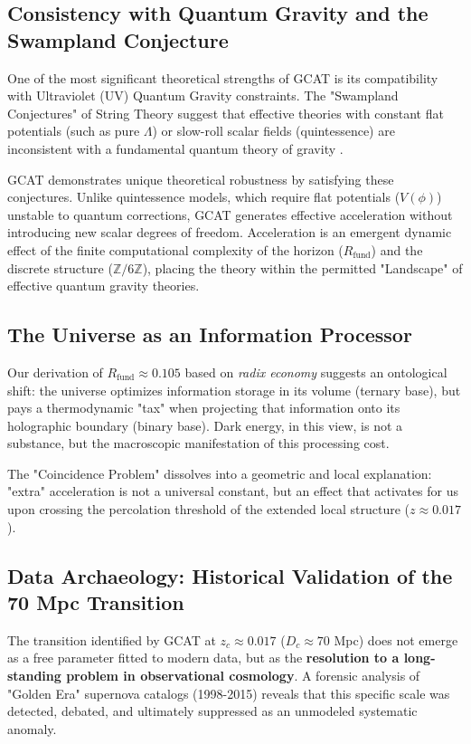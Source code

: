 \documentclass[12pt, a4paper]{article}
\theoremstyle{plain}
\theoremstyle{definition}
\begin{document}
\subsection{Consistency with Quantum Gravity and the Swampland Conjecture}

One of the most significant theoretical strengths of GCAT is its compatibility with Ultraviolet (UV) Quantum Gravity constraints. The "Swampland Conjectures" of String Theory suggest that effective theories with constant flat potentials (such as pure $\Lambda$) or slow-roll scalar fields (quintessence) are inconsistent with a fundamental quantum theory of gravity \cite{Palti2019}.

GCAT demonstrates unique theoretical robustness by satisfying these conjectures. Unlike quintessence models, which require flat potentials ($V(\phi)$) unstable to quantum corrections, GCAT generates effective acceleration without introducing new scalar degrees of freedom. Acceleration is an emergent dynamic effect of the finite computational complexity of the horizon ($R_{\text{fund}}$) and the discrete structure ($\mathbb{Z}/6\mathbb{Z}$), placing the theory within the permitted "Landscape" of effective quantum gravity theories.

\subsection{The Universe as an Information Processor}

Our derivation of $R_{\text{fund}} \approx 0.105$ based on \textit{radix economy} suggests an ontological shift: the universe optimizes information storage in its volume (ternary base), but pays a thermodynamic "tax" when projecting that information onto its holographic boundary (binary base). Dark energy, in this view, is not a substance, but the macroscopic manifestation of this processing cost.

The "Coincidence Problem" dissolves into a geometric and local explanation: "extra" acceleration is not a universal constant, but an effect that activates for us upon crossing the percolation threshold of the extended local structure (\textbf{$z \approx 0.017$}).

\subsection{Data Archaeology: Historical Validation of the 70 Mpc Transition}
\label{subsec:archaeology}

The transition identified by GCAT at $z_c \approx 0.017$ ($D_c \approx 70$ Mpc) does not emerge as a free parameter fitted to modern data, but as the \textbf{resolution to a long-standing problem in observational cosmology}. A forensic analysis of "Golden Era" supernova catalogs (1998-2015) reveals that this specific scale was detected, debated, and ultimately suppressed as an unmodeled systematic anomaly.
\end{document}
